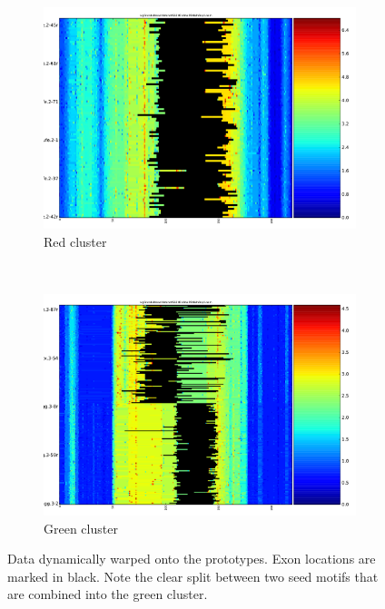 \documentclass[parskip]{cs4rep}
\begin{document}
\begin{figure}[t,b]
\begin{subfigure}[b]{0.22\textwidth}
        \includegraphics[width=\textwidth]{figures/evaluation/exon_stretching/cluster-warped-4.pdf}
        \caption{Red cluster}
        \label{fig:evaluation:exon_stretching:clusters:3:warped}
    \end{subfigure}
    ~
    \begin{subfigure}[b]{0.22\textwidth}
        \includegraphics[width=\textwidth]{figures/evaluation/exon_stretching/cluster-warped-3.pdf}
        \caption{Green cluster}
        \label{fig:evaluation:exon_stretching:clusters:4:warped}
    \end{subfigure}
    \caption{Data dynamically warped onto the prototypes. Exon locations are marked in black. Note the clear split between two seed motifs that are combined into the green cluster.}
    \label{fig:evaluation:exon_stretching:clusters:warped}
\end{figure}
\end{document}
